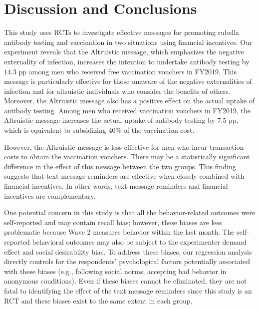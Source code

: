 \documentclass[
      12pt,
    a4paper
]{article}
\begin{document}
\hypertarget{conclusion}{%
\section{Discussion and Conclusions}\label{conclusion}}

This study uses RCTs to investigate effective messages for promoting rubella antibody testing and vaccination in two situations using financial incentives. Our experiment reveals that the Altruistic message, which emphasizes the negative externality of infection, increases the intention to undertake antibody testing by \(14.3\) pp among men who received free vaccination vouchers in FY2019. This message is particularly effective for those unaware of the negative externalities of infection and for altruistic individuals who consider the benefits of others. Moreover, the Altruistic message also has a positive effect on the actual uptake of antibody testing. Among men who received vaccination vouchers in FY2019, the Altruistic message increases the actual uptake of antibody testing by \(7.5\) pp, which is equivalent to subsidizing 40\% of the vaccination cost.

However, the Altruistic message is less effective for men who incur transaction costs to obtain the vaccination vouchers. There may be a statistically significant difference in the effect of this message between the two groups. This finding suggests that text message reminders are effective when closely combined with financial incentives. In other words, text message reminders and financial incentives are complementary.

One potential concern in this study is that all the behavior-related outcomes were self-reported and may contain recall bias; however, these biases are less problematic because Wave 2 measures behavior within the last month. The self-reported behavioral outcomes may also be subject to the experimenter demand effect and social desirability bias. To address these biases, our regression analysis directly controls for the respondents' psychological factors potentially associated with these biases (e.g., following social norms, accepting bad behavior in anonymous conditions). Even if these biases cannot be eliminated, they are not fatal to identifying the effect of the text message reminders since this study is an RCT and these biases exist to the same extent in each group.
\end{document}
